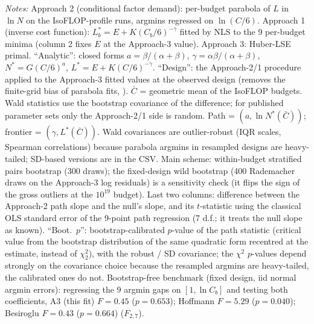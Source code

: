 \begin{table}[!htbp]
\begin{threeparttable}
\begin{tablenotes}[flushleft]
\item \textit{Notes:} Approach 2 (conditional factor demand): per-budget parabola of $L$ in $\ln N$ on the IsoFLOP-profile runs, argmins regressed on $\ln(C/6)$. Approach 1 (inverse cost function): $L^*_b=E+K(C_b/6)^{-\gamma}$ fitted by NLS to the 9 per-budget minima (column 2 fixes $E$ at the Approach-3 value). Approach 3: Huber-LSE primal. ``Analytic'': closed forms $a=\beta/(\alpha+\beta)$, $\gamma=\alpha\beta/(\alpha+\beta)$, $N^*=G(C/6)^a$, $L^*=E+K(C/6)^{-\gamma}$. ``Design'': the Approach-2/1 procedure applied to the Approach-3 fitted values at the observed design (removes the finite-grid bias of parabola fits, \citealt{czech2026problems}). $\bar C$ = geometric mean of the IsoFLOP budgets. Wald statistics use the bootstrap covariance of the difference; for published parameter sets \citep{hoffmann2022training,besiroglu2024chinchilla} only the Approach-2/1 side is random. Path = $(a,\ln N^*(\bar C))$; frontier = $(\gamma,L^*(\bar C))$. Wald covariances are outlier-robust (IQR scales, Spearman correlations) because parabola argmins in resampled designs are heavy-tailed; SD-based versions are in the CSV. Main scheme: within-budget stratified pairs bootstrap (300 draws); the fixed-design wild bootstrap (400 Rademacher draws on the Approach-3 log residuals) is a sensitivity check (it flips the sign of the gross outliers at the $10^{19}$ budget). Last two columns: difference between the Approach-2 path slope and the null's slope, and its $t$-statistic using the classical OLS standard error of the 9-point path regression (7 d.f.; it treats the null slope as known). ``Boot.\ $p$'': bootstrap-calibrated $p$-value of the path statistic (critical value from the bootstrap distribution of the same quadratic form recentred at the estimate, instead of $\chi^2_2$), with the robust / SD covariance; the $\chi^2$ $p$-values depend strongly on the covariance choice because the resampled argmins are heavy-tailed, the calibrated ones do not. Bootstrap-free benchmark (fixed design, iid normal argmin errors): regressing the 9 argmin gaps on $[1,\ln C_b]$ and testing both coefficients, A3 (this fit) $F=0.45$ ($p=0.653$); Hoffmann $F=5.29$ ($p=0.040$); Besiroglu $F=0.43$ ($p=0.664$) ($F_{2,7}$).
\end{tablenotes}
\end{threeparttable}
\end{table}
